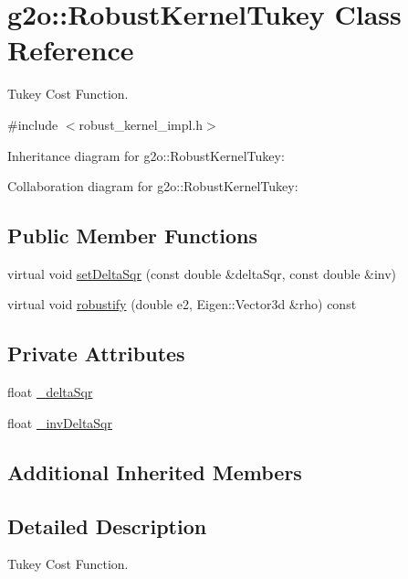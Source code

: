 \hypertarget{classg2o_1_1RobustKernelTukey}{}\section{g2o\+:\+:Robust\+Kernel\+Tukey Class Reference}
\label{classg2o_1_1RobustKernelTukey}


Tukey Cost Function.  




{\ttfamily \#include $<$robust\+\_\+kernel\+\_\+impl.\+h$>$}



Inheritance diagram for g2o\+:\+:Robust\+Kernel\+Tukey\+:


Collaboration diagram for g2o\+:\+:Robust\+Kernel\+Tukey\+:
\subsection*{Public Member Functions}
\begin{DoxyCompactItemize}
\item 
virtual void \hyperlink{classg2o_1_1RobustKernelTukey_a0602ba130364506d65fb86f3473209aa}{set\+Delta\+Sqr} (const double \&delta\+Sqr, const double \&inv)
\item 
virtual void \hyperlink{classg2o_1_1RobustKernelTukey_abcc5f9921110f775db6d652f8fcf4f42}{robustify} (double e2, Eigen\+::\+Vector3d \&rho) const 
\end{DoxyCompactItemize}
\subsection*{Private Attributes}
\begin{DoxyCompactItemize}
\item 
float \hyperlink{classg2o_1_1RobustKernelTukey_a3964d90966fa04e5d8002c1c52bda718}{\+\_\+delta\+Sqr}
\item 
float \hyperlink{classg2o_1_1RobustKernelTukey_addca0bfe5d4cafbe0a030c645efd2754}{\+\_\+inv\+Delta\+Sqr}
\end{DoxyCompactItemize}
\subsection*{Additional Inherited Members}


\subsection{Detailed Description}
Tukey Cost Function. 

